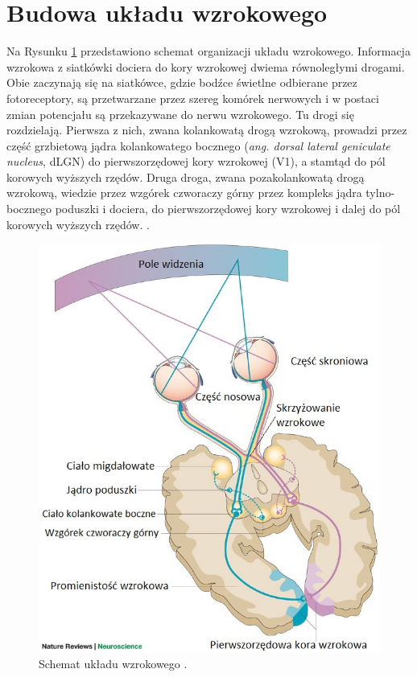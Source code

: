 \documentclass{pracamgr_2}
\begin{document}
\section{Budowa układu wzrokowego}
Na Rysunku \ref{rys:sch_u_wz} przedstawiono schemat organizacji układu wzrokowego. Informacja wzrokowa z siatkówki dociera do kory wzrokowej dwiema równoległymi drogami. Obie zaczynają się na siatkówce, gdzie bodźce świetlne odbierane przez fotoreceptory, są przetwarzane przez szereg komórek nerwowych i w postaci zmian potencjału są przekazywane do nerwu wzrokowego. Tu drogi się rozdzielają. Pierwsza z nich, zwana kolankowatą drogą wzrokową, prowadzi przez część grzbietową jądra kolankowatego bocznego (\textit{ang. dorsal lateral geniculate nucleus}, dLGN)  do pierwszorzędowej kory wzrokowej (V1), a stamtąd do pól korowych wyższych rzędów. Druga droga, zwana pozakolankowatą drogą wzrokową, wiedzie przez wzgórek czworaczy górny przez kompleks jądra tylno-bocznego poduszki i dociera, do pierwszorzędowej kory wzrokowej i dalej do pól korowych wyższych rzędów. \citep{viola}. 
\begin{figure}[htbp]
	\begin{center}
		\includegraphics[scale=0.5]{schemat_ukladu.jpg}
	\end{center}
	\caption{Schemat układu wzrokowego \citep{hannula}.}
	\label{rys:sch_u_wz}
\end{figure}
\end{document}
